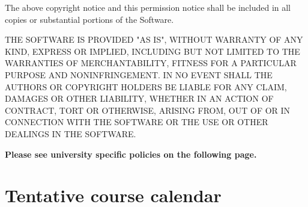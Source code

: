 \documentclass[11pt]{article}
\begin{document}
	The above copyright notice and this permission notice shall be included in all copies or substantial portions of the Software.
	
	THE SOFTWARE IS PROVIDED "AS IS", WITHOUT WARRANTY OF ANY KIND, EXPRESS OR IMPLIED, INCLUDING BUT NOT LIMITED TO THE WARRANTIES OF MERCHANTABILITY, FITNESS FOR A PARTICULAR PURPOSE AND NONINFRINGEMENT. IN NO EVENT SHALL THE
	AUTHORS OR COPYRIGHT HOLDERS BE LIABLE FOR ANY CLAIM, DAMAGES OR OTHER LIABILITY, WHETHER IN AN ACTION OF CONTRACT, TORT OR OTHERWISE, ARISING FROM, OUT OF OR IN CONNECTION WITH THE SOFTWARE OR THE USE OR OTHER DEALINGS IN THE SOFTWARE.
	
	
	\skippers
	\textbf{Please see university specific policies on the following page.}
	\newpage
	
	
	
	\section*{Tentative course calendar}
	
\end{document}
